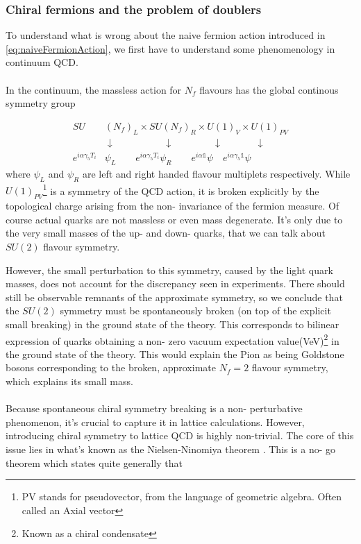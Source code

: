 \documentclass[a4paper,10pt]{article}
\begin{document}
\subsubsection{Chiral fermions and the problem of doublers}\label{Chiral_symmetry_breaking}
To understand what is wrong about the naive fermion action introduced in \eqref{eq:naiveFermionAction}, we first have to understand some phenomenology in continuum QCD.\\\\In the continuum, the massless action for $N_f$ flavours has the global continous symmetry group

\begin{equation}\label{eq:SU_SU_U_U}
\begin{aligned} 
SU&(N_f)_L\times SU (N_f)_R\times U(1)_V \times U(1)_{PV}\\ &\downarrow \quad\quad\quad\quad\quad \downarrow\quad\quad\quad\quad \downarrow\quad\quad\quad \,\,\downarrow\\
e^{i\alpha\gamma_5T_i}&\psi_L\quad \quad e^{i\alpha\gamma_5T_i}\psi_R\quad \quad e^{i\alpha\mathbb{1}}\psi\quad e^{i\alpha\gamma_5\mathbb{1}}\psi
\end{aligned}
\end{equation}
where $\psi_L$ and $\psi_R$ are left and right handed flavour multiplets respectively. While $U(1)_{PV}$\footnote{PV stands for pseudovector, from the language of geometric algebra. Often called an Axial vector} is a symmetry of the QCD action, it is broken explicitly by the topological charge arising from the non- invariance of the fermion measure. Of course actual quarks are not massless or even mass degenerate. It's only due to the very small masses of the up- and down- quarks, that we can talk about $SU(2)$ flavour symmetry.\par However, the small perturbation to this symmetry, caused by the light quark masses, does not account for the discrepancy seen in experiments. There should still be observable remnants of the approximate symmetry, so we conclude that the $SU(2)$ symmetry must be spontaneously broken (on top of the explicit small breaking) in the ground state of the theory. This corresponds to bilinear expression of quarks obtaining a non- zero vacuum expectation value(VeV)\footnote{Known as a chiral condensate} in the ground state of the theory. This would explain the Pion as being Goldstone bosons corresponding to the broken, approximate $N_f=2$ flavour symmetry, which explains its small mass.\\\\Because spontaneous chiral symmetry breaking is a non- perturbative phenomenon, it's crucial to capture it in lattice calculations. However, introducing chiral symmetry to lattice QCD is highly non-trivial. The core of this issue lies in what's known as the Nielsen-Ninomiya theorem \cite{NielsenH.B1981Antf}. This is a no- go theorem which states quite generally that
\end{document}

